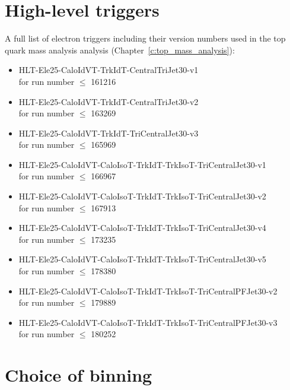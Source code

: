 
\chapter{High-level triggers}
\label{a:full_trigger_list}
 
A full list of electron triggers including their version numbers used in the top quark mass analysis analysis
(Chapter~\ref{c:top_mass_analysis}):
\begin{itemize}
 \item HLT-Ele25-CaloIdVT-TrkIdT-CentralTriJet30-v1 \\for run number $\leq$ 161216
 \item HLT-Ele25-CaloIdVT-TrkIdT-CentralTriJet30-v2 \\for run number $\leq$ 163269
 \item HLT-Ele25-CaloIdVT-TrkIdT-TriCentralJet30-v3 \\for run number $\leq$ 165969
 \item HLT-Ele25-CaloIdVT-CaloIsoT-TrkIdT-TrkIsoT-TriCentralJet30-v1 \\for run number $\leq$ 166967
 \item HLT-Ele25-CaloIdVT-CaloIsoT-TrkIdT-TrkIsoT-TriCentralJet30-v2 \\for run number $\leq$ 167913
 \item HLT-Ele25-CaloIdVT-CaloIsoT-TrkIdT-TrkIsoT-TriCentralJet30-v4 \\for run number $\leq$ 173235
 \item HLT-Ele25-CaloIdVT-CaloIsoT-TrkIdT-TrkIsoT-TriCentralJet30-v5 \\for run number $\leq$ 178380
 \item \small{HLT-Ele25-CaloIdVT-CaloIsoT-TrkIdT-TrkIsoT-TriCentralPFJet30-v2 \\for run number $\leq$ 179889}
 \item HLT-Ele25-CaloIdVT-CaloIsoT-TrkIdT-TrkIsoT-TriCentralPFJet30-v3 \\for run number $\leq$ 180252
\end{itemize}

\ifpdf
    \graphicspath{{06_Cross_section_analysis/plots/}}
\else
    \graphicspath{{06_Cross_section_analysis/plots/EPS/}{06_Cross_section_analysis/plots/}}
\fi

\chapter{Choice of binning}
\label{a:binning}

